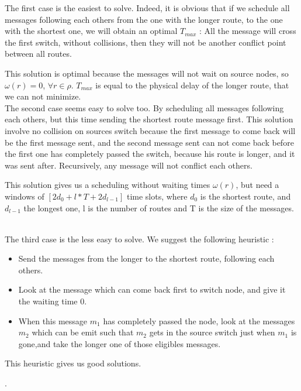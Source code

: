 \documentclass{article}
\begin{document}
The first case is the easiest to solve. Indeed, it is obvious that if we schedule all messages following each others from the one with the longer route,
to the one with the shortest one, we will obtain an optimal $T_{max}$ : All the message will cross the first switch, without collisions, then 
they will not be another conflict point between all routes.

This solution is optimal because the messages will not wait on source nodes, so $\omega(r) = 0$, $\forall r \in \rho$. $T_{max}$ is
equal to the physical delay of the longer route, that we can not minimize.\\

The second case seems easy to solve too. By scheduling all messages following each others, but this time sending the shortest route message first.
This solution involve no collision on sources switch because the first message to come back will be the first message sent, and the second
message sent can not come back before the first one has completely passed the switch, because his route is longer, and it was sent after.
Recursively, any message will not conflict each others.

This solution gives us a scheduling without waiting times $\omega(r)$, but need a windows of  $[2d_0+l*T + 2d_{l-1}]$ time slots, where
$d_0$ is the shortest route, and $d_{l-1}$ the longest one, l is the number of routes and T is the size of the messages.

\\

The third case is the less easy to solve. We suggest the following heuristic :
\begin{itemize}
 \item Send the messages from the longer to the shortest route, following each others.
 \item Look at the message which can come back first to switch node, and give it the waiting time 0.
 \item When this message $m_1$ has completely passed the node, look at the messages $m_2$ which can be emit such that $m_2$ gets in the
 source switch just when $m_1$ is gone,and take the longer one of those eligibles messages.
\end{itemize}

This heuristic gives us good solutions. 

.


\end{document}
